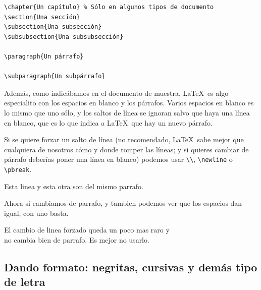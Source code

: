 \begin{verbatim}
\chapter{Un capítulo} % Sólo en algunos tipos de documento
\section{Una sección}
\subsection{Una subsección}
\subsubsection{Una subsubsección}

\paragraph{Un párrafo}

\subparagraph{Un subpárrafo}
\end{verbatim}

Además, como indicábamos en el documento de muestra, \LaTeX\ es algo especialito con los espacios en blanco y los párrafos. Varios espacios en blanco es lo mismo que uno sólo, y los saltos de línea se ignoran salvo que haya una línea en blanco, que es lo que indica a \LaTeX\ que hay un nuevo párrafo.

Si se quiere forzar un salto de línea (no recomendado, \LaTeX\ sabe mejor que cualquiera de nosotros cómo y donde romper las líneas; y si quieres cambiar de párrafo deberías poner una línea en blanco) podemos usar \verb|\\|, \verb|\newline| o \verb|\pbreak|.

\begin{LTXexample}[pos=r]
Esta linea
y esta otra
son del mismo parrafo.

Ahora si cambiamos de parrafo, y tambien podemos ver que
los       espacios dan igual, con uno basta.

El cambio de linea forzado queda un poco mas raro y \\
no cambia bien de
parrafo. Es mejor no usarlo.
\end{LTXexample}

\subsection{Dando formato: negritas, cursivas y demás tipo de letra}

